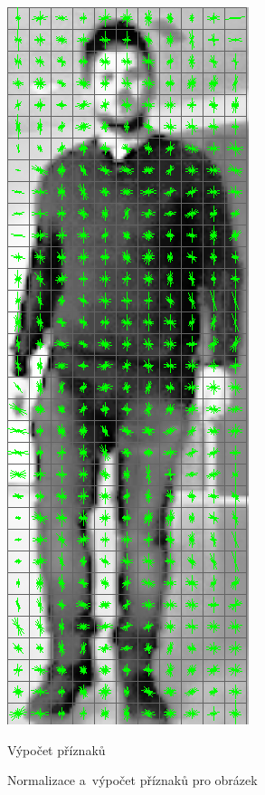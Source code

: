 \begin{figure}[H]
\begin{minipage}{.3\textwidth}
  \includegraphics[width=.5\linewidth]{figures/features}
  \caption*{Výpočet příznaků}
  \label{fig:hog_features}
\end{minipage}
\caption{Normalizace a~výpočet příznaků pro obrázek}
\label{fig:hogCalc}
\end{figure}

